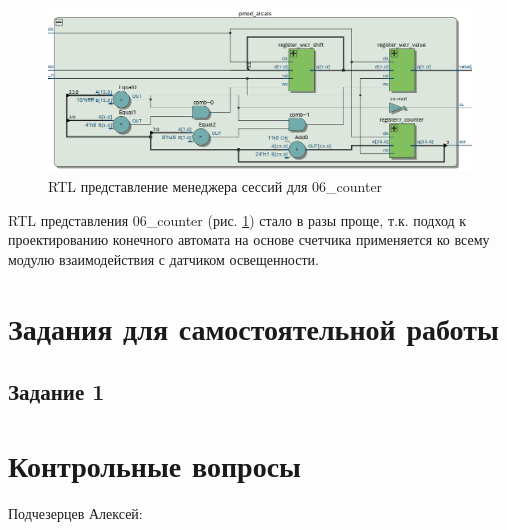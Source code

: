 \documentclass[a4paper,14pt]{article}
\begin{document}
	\begin{figure}[H]
		\centering
		\includegraphics[width=0.9\linewidth]{images/z8_rtl}
		\caption{RTL представление менеджера сессий для 06\_counter}
		\label{fig:z8rtl}
	\end{figure}
		
	RTL представления 06\_counter (рис. \ref{fig:z8rtl}) стало в разы проще, т.к. подход к проектированию конечного автомата на основе счетчика	применяется ко всему модулю взаимодействия с датчиком освещенности.
	
	\section{Задания для самостоятельной работы}

	\subsection{Задание 1}

	\section{Контрольные вопросы}
	
	Подчезерцев Алексей:
	
\end{document}
